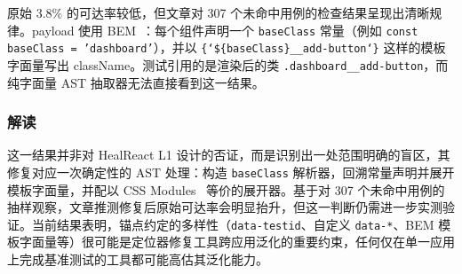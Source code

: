 原始 3.8\% 的可达率较低，但文章对 307 个未命中用例的检查结果呈现出清晰规律。payload 使用 BEM~\cite{bemMethodology}：每个组件声明一个 \texttt{baseClass} 常量（例如 \texttt{const baseClass = 'dashboard'}），并以 \texttt{\{`\$\{baseClass\}\_\_add-button`\}} 这样的模板字面量写出 className。测试引用的是渲染后的类 \texttt{.dashboard\_\_add-button}，而纯字面量 AST 抽取器无法直接看到这一结果。

\subsubsection{解读}
这一结果并非对 HealReact L1 设计的否证，而是识别出一处范围明确的盲区，其修复对应一次确定性的 AST 处理：构造 \texttt{baseClass} 解析器，回溯常量声明并展开模板字面量，并配以 CSS Modules~\cite{cssModules} 等价的展开器。基于对 307 个未命中用例的抽样观察，文章推测修复后原始可达率会明显抬升，但这一判断仍需进一步实测验证。当前结果表明，锚点约定的多样性（\texttt{data-testid}、自定义 \texttt{data-*}、BEM 模板字面量等）很可能是定位器修复工具跨应用泛化的重要约束，任何仅在单一应用上完成基准测试的工具都可能高估其泛化能力。

